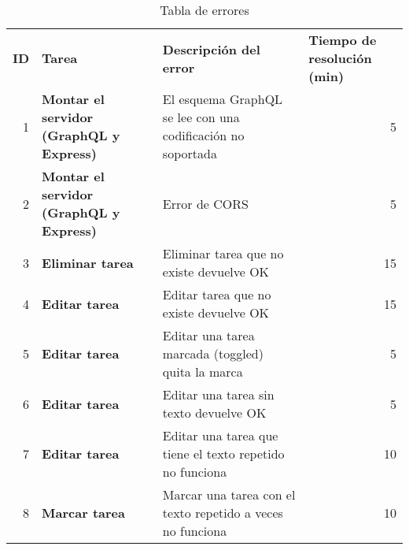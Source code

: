 \begin{table}[]
\centering
\caption{Tabla de errores}
\label{tab:errors}
\begin{adjustbox}{width=\columnwidth,center}
\begin{tabular}{rllr}
\multicolumn{1}{l}{\textbf{ID}} & \textbf{Tarea}                                  & \textbf{Descripción del error}                                                     & \multicolumn{1}{l}{\textbf{Tiempo de resolución (min)}} \\
1                               & \textbf{Montar el servidor (GraphQL y Express)} & El esquema GraphQL se lee con una codificación no soportada                        & 5                                                       \\
2                               & \textbf{Montar el servidor (GraphQL y Express)} & Error de CORS                                                                      & 5                                                       \\
3                               & \textbf{Eliminar tarea}                         & Eliminar tarea que no existe devuelve OK                                           & 15                                                      \\
4                               & \textbf{Editar tarea}                           & Editar tarea que no existe devuelve OK                                             & 15                                                      \\
5                               & \textbf{Editar tarea}                           & Editar una tarea marcada (toggled) quita la marca                                  & 5                                                       \\
6                               & \textbf{Editar tarea}                           & Editar una tarea sin texto devuelve OK                                             & 5                                                       \\
7                               & \textbf{Editar tarea}                           & Editar una tarea que tiene el texto repetido no funciona                           & 10                                                      \\
8                               & \textbf{Marcar tarea}                           & Marcar una tarea con el texto repetido a veces no funciona                         & 10                                                      \\

\end{tabular}
\end{adjustbox}
\end{table}
